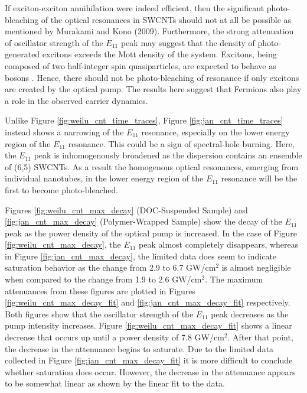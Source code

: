 If exciton-exciton annihilation were indeed efficient, then the significant photo-bleaching of the optical resonances in SWCNTs should not at all be possible as mentioned by Murakami and Kono (2009). Furthermore, the strong attenuation of oscillator strength of the $E_{11}$ peak may suggest that the density of photo-generated excitons exceeds the Mott density of the system. Excitons, being composed of two half-integer spin quasiparticles, are expected to behave as bosons \cite{Ashcroft, laikhtman2007excitons}. Hence, there should not be photo-bleaching of resonance if only excitons are created by the optical pump. The results here suggest that Fermions also play a role in the observed carrier dynamics.

Unlike Figure \ref{fig:weilu_cnt_time_traces}, Figure \ref{fig:jan_cnt_time_traces} instead shows a narrowing of the $E_{11}$ resonance, especially on the lower energy region of the $E_{11}$ resonance. This could be a sign of spectral-hole burning. Here, the $E_{11}$ peak is inhomogenously broadened as the dispersion contains an ensemble of (6,5) SWCNTs. As a result the homogenous optical resonances, emerging from individual nanotubes, in the lower energy region of the $E_{11}$ resonance will be the first to become photo-bleached.

Figures \ref{fig:weilu_cnt_max_decay}  (DOC-Suspended Sample) and \ref{fig:jan_cnt_max_decay} (Polymer-Wrapped Sample) show the decay of the $E_{11}$ peak as the power density of the optical pump is increased. In the case of Figure \ref{fig:weilu_cnt_max_decay}, the $E_{11}$ peak almost completely disappears, whereas in Figure \ref{fig:jan_cnt_max_decay}, the limited data does seem to indicate saturation behavior as the change from 2.9 to 6.7 GW/cm$^2$ is almost negligible when compared to the change from 1.9 to 2.6 GW/cm$^2$. The maximum attenuances from these figures are plotted in Figures \ref{fig:weilu_cnt_max_decay_fit} and \ref{fig:jan_cnt_max_decay_fit} respectively. Both figures show that the oscillator strength of the $E_{11}$ peak decreases as the pump intensity increases. Figure \ref{fig:weilu_cnt_max_decay_fit} shows a linear decrease that occurs up until a power density of 7.8 GW/cm$^2$. After that point, the decrease in the attenuance begins to saturate. Due to the limited data collected in Figure \ref{fig:jan_cnt_max_decay_fit} it is more difficult to conclude whether saturation does occur. However, the decrease in the attenuance appears to be somewhat linear as shown by the linear fit to the data.

